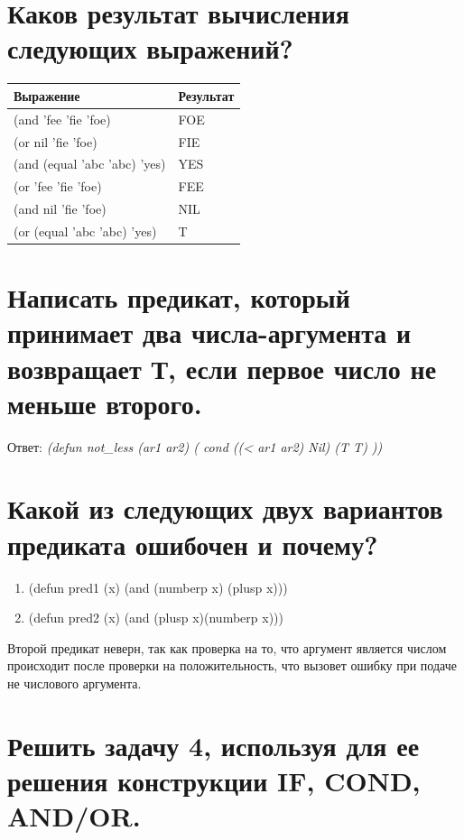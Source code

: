 \documentclass[a4paper,12pt]{article}
\begin{document}
	\section{Каков результат вычисления следующих выражений?}
	
	\begin{table} [h!]
		\begin{center}
			\begin{tabular}{|l|l|}
				\hline
				{\bf  Выражение} &    {\bf Результат} \\
				\hline
				{(and 'fee 'fie 'foe)} & FOE\\
				\hline
				{(or nil 'fie 'foe)} & FIE\\
				\hline
				{(and (equal 'abc 'abc) 'yes)} & YES\\
				\hline
				{(or 'fee 'fie 'foe)} & FEE\\
				\hline
				{(and nil 'fie 'foe)} & NIL\\
				\hline
				{(or (equal 'abc 'abc) 'yes)} & T\\
				\hline
			\end{tabular}  
			\label{m1}
		\end{center}
	\end{table}
	
	\section{Написать предикат, который принимает два числа-аргумента и возвращает
Т, если первое число не меньше второго.
	}

	Ответ: \textit{(defun not\_less (ar1 ar2) (
		cond ((< ar1 ar2) Nil)
		(T T)
		))}

	\section{Какой из следующих двух вариантов предиката ошибочен и почему?}
	
	\begin{enumerate}
		\item (defun pred1 (x) 	(and (numberp x) (plusp x)))
		\item (defun pred2 (x) (and (plusp x)(numberp x)))
	\end{enumerate}

	Второй предикат неверн, так как проверка на то, что аргумент является числом происходит после проверки на положительность, что вызовет ошибку при подаче не числового аргумента.
	
	
	\section{Решить задачу 4, используя для ее решения конструкции IF, COND, AND/OR.}
	
\end{document}
